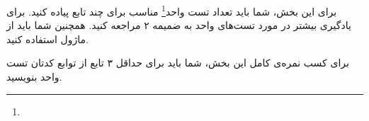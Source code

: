 برای این بخش، شما باید تعداد تست واحد\footnote{} مناسب برای چند تابع پیاده کنید. برای یادگیری بیشتر در مورد تست‌های واحد به ضمیمه ۲ مراجعه کنید. همچنین شما باید از ماژول  استفاده کنید.

برای کسب نمره‌ی کامل این بخش، شما باید برای حداقل ۳ تابع از توابع کدتان تست واحد بنویسید.